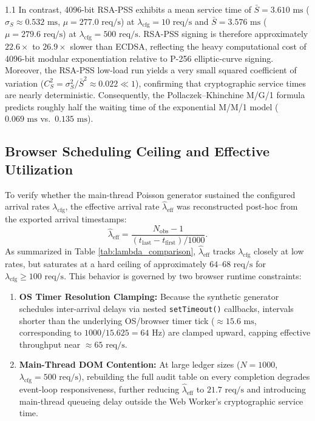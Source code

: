 \documentclass[11pt,a4paper]{article}
\begin{document}
\begin{spacing}{1.1}
\noindent
In contrast, 4096-bit RSA-PSS exhibits a mean service time of $\bar{S} = 3.610\text{ ms}$ ($\sigma_S \approx 0.532\text{ ms}$, $\mu = 277.0\text{ req/s}$) at $\lambda_{\text{cfg}} = 10\text{ req/s}$ and $\bar{S} = 3.576\text{ ms}$ ($\mu = 279.6\text{ req/s}$) at $\lambda_{\text{cfg}} = 500\text{ req/s}$. RSA-PSS signing is therefore approximately $22.6\times$ to $26.9\times$ slower than ECDSA, reflecting the heavy computational cost of 4096-bit modular exponentiation relative to P-256 elliptic-curve signing. Moreover, the RSA-PSS low-load run yields a very small squared coefficient of variation ($C_S^2 = \sigma_S^2 / \bar{S}^2 \approx 0.022 \ll 1$), confirming that cryptographic service times are nearly deterministic. Consequently, the Pollaczek--Khinchine M/G/1 formula predicts roughly half the waiting time of the exponential M/M/1 model ($0.069\text{ ms}$ vs.\ $0.135\text{ ms}$).

\pagebreak 
\subsection{Browser Scheduling Ceiling and Effective Utilization}
To verify whether the main-thread Poisson generator sustained the configured arrival rates $\lambda_{\text{cfg}}$, the effective arrival rate $\hat{\lambda}_{\text{eff}}$ was reconstructed post-hoc from the exported arrival timestamps:
\[
\hat{\lambda}_{\text{eff}} = \frac{N_{\text{obs}} - 1}{(t_{\text{last}} - t_{\text{first}}) / 1000}.
\]
As summarized in Table \ref{tab:lambda_comparison}, $\hat{\lambda}_{\text{eff}}$ tracks $\lambda_{\text{cfg}}$ closely at low rates, but saturates at a hard ceiling of approximately $64\text{--}68\text{ req/s}$ for $\lambda_{\text{cfg}} \ge 100\text{ req/s}$. This behavior is governed by two browser runtime constraints:
\begin{enumerate}
    \item \textbf{OS Timer Resolution Clamping:} Because the synthetic generator schedules inter-arrival delays via nested \texttt{setTimeout()} callbacks, intervals shorter than the underlying OS/browser timer tick ($\approx 15.6\text{ ms}$, corresponding to $1000 / 15.625 = 64\text{ Hz}$) are clamped upward, capping effective throughput near $\approx 65\text{ req/s}$.
    \item \textbf{Main-Thread DOM Contention:} At large ledger sizes ($N = 1000$, $\lambda_{\text{cfg}} = 500\text{ req/s}$), rebuilding the full audit table on every completion degrades event-loop responsiveness, further reducing $\hat{\lambda}_{\text{eff}}$ to $21.7\text{ req/s}$ and introducing main-thread queueing delay outside the Web Worker's cryptographic service time.
\end{enumerate}


\end{spacing}
\end{document}
